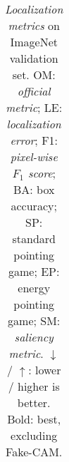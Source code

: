 \begin{table}[ht]
\begin{tabular}{lccc|cccc|ccc|cccc}
    \bottomrule
    \end{tabular}
    \caption{\emph{Localization metrics} on ImageNet validation set. OM: \emph{official metric}; 
    LE: \emph{localization error}; F1: \emph{pixel-wise $F_1$ score}; BA: box accuracy; SP: standard 
    pointing game; EP: energy pointing game; SM: \emph{saliency metric}. $\downarrow$ / $\uparrow$: 
    lower / higher is better. Bold: best, excluding Fake-CAM.}
    \label{tab:imagenet-loc}
\end{table}
